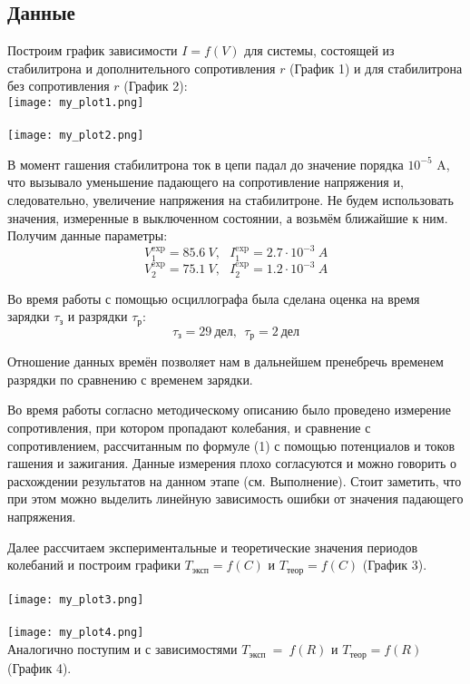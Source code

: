 \subsection{\label{sec:level2}Данные}

Построим график зависимости $I = f(V)$ для системы, состоящей из стабилитрона и дополнительного сопротивления $r$ (График 1) и для стабилитрона без сопротивления $r$ (График 2):\\
\texttt{[image: my\_plot1.png]} \\
\\
\texttt{[image: my\_plot2.png]}

В момент гашения стабилитрона ток в цепи падал до значение порядка $10^{-5}$ A, что вызывало уменьшение падающего на сопротивление напряжения и, следовательно, увеличение напряжения на стабилитроне. Не будем использовать значения, измеренные в выключенном состоянии, а возьмём ближайшие к ним. Получим данные параметры:
$$\boxed{V_1^{\text{exp}} = 85.6~V,~~~I_1^{\text{exp}} = 2.7 \cdot 10^{-3}~A}$$
$$V_2^{\text{exp}} = 75.1~V,~~~I_2^{\text{exp}} = 1.2 \cdot 10^{-3}~A$$

Во время работы с помощью осциллографа была сделана оценка на время зарядки $\tau_{\text{з}}$ и разрядки $\tau_{\text{р}}$:
$$\tau_{\text{з}} = 29~\text{дел},~~\tau_{\text{р}} = 2~\text{дел}$$

Отношение данных времён позволяет нам в дальнейшем пренебречь временем разрядки по сравнению с временем зарядки.

Во время работы согласно методическому описанию было проведено измерение сопротивления, при котором пропадают колебания, и сравнение с сопротивлением, рассчитанным по формуле (1) с помощью потенциалов и токов гашения и зажигания. Данные измерения плохо согласуются и можно говорить о расхождении результатов на данном этапе (см. Выполнение). Стоит заметить, что при этом можно выделить линейную зависимость ошибки от значения падающего напряжения.

Далее рассчитаем экспериментальные и теоретические значения периодов колебаний и построим графики $T_{\text{эксп}} = f(C)$ и $T_{\text{теор}} = f(C)$ (График 3).\\
\\
\texttt{[image: my\_plot3.png]}\\
\\
\texttt{[image: my\_plot4.png]}\\

Аналогично поступим и с зависимостями $T_{\text{эксп}}~=~f(R)$ и $T_{\text{теор}} = f(R)$ (График 4).\\

